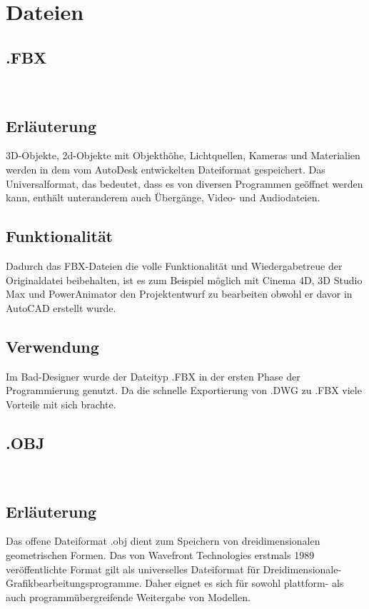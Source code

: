 \chapter{Dateien}
\section{.FBX}
~\cite{FBX_01} ~\cite{FBX_02}
\section*{Erläuterung}
3D-Objekte, 2d-Objekte mit Objekthöhe, Lichtquellen, Kameras und Materialien werden in dem vom AutoDesk entwickelten Dateiformat gespeichert. Das Universalformat, das bedeutet, dass es von diversen Programmen geöffnet werden kann, enthält unteranderem auch Übergänge, Video- und Audiodateien. 

\section*{Funktionalität}
Dadurch das FBX-Dateien die volle Funktionalität und Wiedergabetreue der Originaldatei beibehalten, ist es zum Beispiel möglich mit Cinema 4D, 3D Studio Max und PowerAnimator den Projektentwurf zu bearbeiten obwohl er davor in AutoCAD erstellt wurde. 

\section*{Verwendung}
Im Bad-Designer wurde der Dateityp .FBX in der ersten Phase der Programmierung genutzt. Da die schnelle Exportierung von .DWG zu .FBX viele Vorteile mit sich brachte.

\clearpage
\newpage

\section{.OBJ}
~\cite{OBJ_01}~\cite{OBJ_02}
\section*{Erläuterung}
Das offene Dateiformat .obj dient zum Speichern von dreidimensionalen geometrischen Formen. Das von Wavefront Technologies erstmals 1989 veröffentlichte Format gilt als universelles Dateiformat für Dreidimensionale-Grafikbearbeitungsprogramme. Daher eignet es sich für sowohl plattform- als auch programmübergreifende Weitergabe von Modellen.

